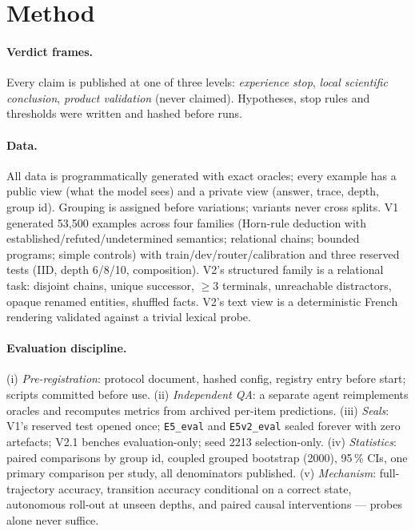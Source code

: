 \documentclass[11pt,a4paper]{article}
\newcommand{\code}[1]{\texttt{#1}}
\begin{document}
\section{Method}
\label{sec:method}

\paragraph{Verdict frames.} Every claim is published at one of three levels: \emph{experience stop}, \emph{local scientific conclusion}, \emph{product validation} (never claimed). Hypotheses, stop rules and thresholds were written and hashed before runs.

\paragraph{Data.} All data is programmatically generated with exact oracles; every example has a public view (what the model sees) and a private view (answer, trace, depth, group id). Grouping is assigned before variations; variants never cross splits. V1 generated 53{,}500 examples across four families (Horn-rule deduction with established/refuted/undetermined semantics; relational chains; bounded programs; simple controls) with train/dev/router/calibration and three reserved tests (IID, depth 6/8/10, composition). V2's structured family is a relational task: disjoint chains, unique successor, $\ge 3$ terminals, unreachable distractors, opaque renamed entities, shuffled facts. V2's text view is a deterministic French rendering validated against a trivial lexical probe.

\paragraph{Evaluation discipline.} (i) \emph{Pre-registration}: protocol document, hashed config, registry entry before start; scripts committed before use. (ii) \emph{Independent QA}: a separate agent reimplements oracles and recomputes metrics from archived per-item predictions. (iii) \emph{Seals}: V1's reserved test opened once; \code{E5\_eval} and \code{E5v2\_eval} sealed forever with zero artefacts; V2.1 benches evaluation-only; seed 2213 selection-only. (iv) \emph{Statistics}: paired comparisons by group id, coupled grouped bootstrap (2000), 95\,\% CIs, one primary comparison per study, all denominators published. (v) \emph{Mechanism}: full-trajectory accuracy, transition accuracy conditional on a correct state, autonomous roll-out at unseen depths, and paired causal interventions --- probes alone never suffice.
\end{document}
